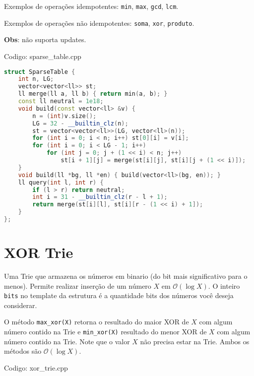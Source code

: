 \documentclass[10pt, a4paper, oneside]{book}
\begin{document}
Exemplos de operações idempotentes: \texttt{min}, \texttt{max}, \texttt{gcd}, \texttt{lcm}.



Exemplos de operações não idempotentes: \texttt{soma}, \texttt{xor}, \texttt{produto}.



\textbf{Obs}: não suporta updates.

\hfill

Codigo: sparse\_table.cpp

\begin{lstlisting}[language=C++]
struct SparseTable {
    int n, LG;
    vector<vector<ll>> st;
    ll merge(ll a, ll b) { return min(a, b); }
    const ll neutral = 1e18;
    void build(const vector<ll> &v) {
        n = (int)v.size();
        LG = 32 - __builtin_clz(n);
        st = vector<vector<ll>>(LG, vector<ll>(n));
        for (int i = 0; i < n; i++) st[0][i] = v[i];
        for (int i = 0; i < LG - 1; i++)
            for (int j = 0; j + (1 << i) < n; j++)
                st[i + 1][j] = merge(st[i][j], st[i][j + (1 << i)]);
    }
    void build(ll *bg, ll *en) { build(vector<ll>(bg, en)); }
    ll query(int l, int r) {
        if (l > r) return neutral;
        int i = 31 - __builtin_clz(r - l + 1);
        return merge(st[i][l], st[i][r - (1 << i) + 1]);
    }
};
\end{lstlisting}
\hfill

\section{XOR Trie}


Uma Trie que armazena os números em binario (do bit mais significativo para o menos). Permite realizar inserção de um número $X$ em $\mathcal{O}(\log X)$. O inteiro \texttt{bits} no template da estrutura é a quantidade bits dos números você deseja considerar.



O método \texttt{max\_xor(X)} retorna o resultado do maior XOR de $X$ com algum número contido na Trie e \texttt{min\_xor(X)} resultado do menor XOR de $X$ com algum número contido na Trie. Note que o valor $X$ não precisa estar na Trie. Ambos os métodos são $\mathcal{O}(\log X)$.

\hfill

Codigo: xor\_trie.cpp
\end{document}
